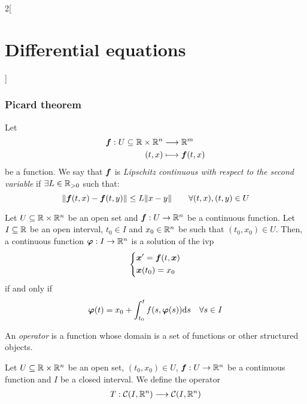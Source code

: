\documentclass[../../../main.tex]{subfiles}
\begin{document}
\begin{multicols}{2}[\section{Differential equations}]
  \subsubsection*{Picard theorem}
  \begin{definition}
    Let
    \begin{align*}
      \boldsymbol{f}:U\subseteq\mathbb{R}\times\mathbb{R}^n & \longrightarrow\mathbb{R}^m               \\
      (t,x)                                       & \longmapsto\boldsymbol{f}(t,x)
    \end{align*}
    be a function. We say that $\boldsymbol{f}$ is \textit{Lipschitz continuous with respect to the second variable} if $\exists L\in\mathbb{R}_{>0}$ such that: $$\|\boldsymbol{f}(t,x)-\boldsymbol{f}(t,y)\|\leq L\|x-y\|\qquad\forall (t,x),(t,y)\in U$$
  \end{definition}
  \begin{prop}
    Let $U\subseteq\mathbb{R}\times\mathbb{R}^n$ be an open set and $\boldsymbol{f}:U\rightarrow\mathbb{R}^n$ be a continuous function. Let $I\subseteq\mathbb{R}$ be an open interval, $t_0\in I$ and $x_0\in\mathbb{R}^n$ be such that $(t_0,x_0)\in U$. Then, a continuous function $\boldsymbol{\varphi}:I\rightarrow\mathbb{R}^n$ is a solution of the ivp
    \begin{equation}
      \left\{
      \begin{aligned}
         & \boldsymbol{x}'=\boldsymbol{f}(t,\boldsymbol{x}) \\
         & \boldsymbol{x}(t_0)=x_0
      \end{aligned}
      \right.
      \label{DE_ivp}
    \end{equation}
    if and only if $$\boldsymbol{\varphi}(t)=x_0+\int_{t_0}^tf(s,\boldsymbol{\varphi}(s))\dd s\quad\forall s\in I$$
  \end{prop}
  \begin{definition}
    An \textit{operator} is a function whose domain is a set of functions or other structured objects.
  \end{definition}
  \begin{definition}
    Let $U\subseteq\mathbb{R}\times\mathbb{R}^n$ be an open set, $(t_0,x_0)\in U$, $\boldsymbol{f}:U\rightarrow\mathbb{R}^n$ be a continuous function and $I$ be a closed interval. We define the operator
    \begin{align*}
      T:\mathcal{C}(I,\RR^n)   & \longrightarrow\mathcal{C}(I,\RR^n)                                                                           \\

\end{align*}
\end{definition}
\end{multicols}
\end{document}

